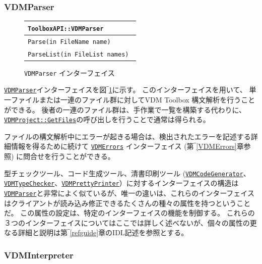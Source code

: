 \documentclass[\pformat,12pt]{jarticle}
\newcommand{\VDMCodeGenerator}{\hyperlink{interface.VDMCodeGenerator}{VDMCodeGenerator}}
\newcommand{\VDMErrors}{\hyperlink{interface.VDMErrors}{VDMErrors}}
\newcommand{\VDMParser}{\hyperlink{interface.VDMParser}{VDMParser}}
\newcommand{\VDMPrettyPrinter}{\hyperlink{interface.VDMPrettyPrinter}{VDMPrettyPrinter}}
\newcommand{\VDMTypeChecker}{\hyperlink{interface.VDMTypeChecker}{VDMTypeChecker}}
\begin{document}
\subsubsection{VDMParser}


\begin{figure}[tbh]
\begin{center}
\begin{tabular}{|l|}
\hline
{\tt ToolboxAPI::VDMParser } \\
\hline
{\tt Parse(in FileName name) } \\
{\tt ParseList(in FileList names) } \\
\hline
\end{tabular}
\caption{{\tt VDMParser} インターフェイス}\label{fig:VDMParser}
\end{center}
\end{figure}

{\tt \VDMParser}インターフェイスを図‾\ref{fig:VDMParser}に示す。
このインターフェイスを用いて、 単一ファイルまたは一連のファイル群に対してVDM Toolbox 構文解析を行うことができる。
後者の一連のファイル群は、手作業で一覧を構築する代わりに、\texttt{\hyperlink{method.VDMProject::GetFiles}{VDMProject::GetFiles}}の呼び出しを行うことで通常は得られる。

ファイルの構文解析中にエラーが起きる場合は、検出されたエラーを記述する詳細情報を得るために続けて {\tt  \VDMErrors} インターフェイス (第‾\ref{VDMErrors}章参照) に問合せを行うことができる。

型チェックツール、コード生成ツール、清書印刷ツール ({\tt \VDMCodeGenerator}、{\tt \VDMTypeChecker}、{\tt \VDMPrettyPrinter}）に対するインターフェイスの構造は{\tt \VDMParser}と非常によく似ているが、唯一の違いは、これらのインターフェイスはクライアントが読み込み修正できるたくさんの種々の属性を持つということだ。
この属性の設定は、特定のインターフェイスの機能を制御する。
これらの３つのインターフェイスについてはここでは詳しく述べないが、個々の属性の更なる詳細と説明は第‾\ref{refguide}章のIDL記述を参照とする。

\subsubsection{VDMInterpreter}
\end{document}

